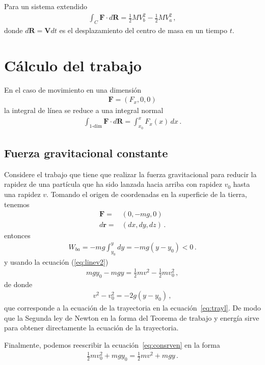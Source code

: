 Para un sistema extendido
\begin{align}
  \int_C \mathbf{F}\cdot d\mathbf{R}=\tfrac{1}{2}M V_b^2-\tfrac{1}{2}M V_a^2\,,
\end{align}
donde $d\mathbf{R}=\mathbf{V}dt$ es el desplazamiento del centro de masa en un tiempo $t$.


\section{Cálculo del trabajo}
En el caso de movimiento en una dimensión
\begin{align*}
  \mathbf{F}=(F_x,0,0)
\end{align*}
la integral de línea se reduce a una integral normal
\begin{align*}
  \int_{\text{1-dim}}\mathbf{F}\cdot d\mathbf{R}=\int_{x_0}^{x}F_x(x)\,dx\,.
\end{align*}


\subsection{Fuerza gravitacional constante}
Considere el trabajo que tiene que realizar la fuerza gravitacional
para reducir la rapidez de una partícula que ha sido lanzada hacia
arriba con rapidez $v_0$ hasta una rapidez $v$. Tomando el origen de coordenadas en la superficie de la tierra, tenemos
\begin{align*}
  \mathbf{F}=&(0,-mg,0)\nonumber\\
  d\mathbf{r}=&(dx,dy,dz)\,.
\end{align*}
entonces
\begin{align*}
  W_{ba}=-mg\int_{y_0}^ydy=-mg(y-y_0)<0\,.
\end{align*}
y usando la ecuación (\ref{eq:linev2})
\begin{align}
  \label{eq:consrven}
  mgy_0-mgy=\tfrac{1}{2}m v^2-\tfrac{1}{2}m v_0^2\,,
\end{align}
de donde
\begin{align*}
  v^2-v_0^2=-2g(y-y_0)\,,
\end{align*}
que corresponde a la ecuación de la trayectoria en la
ecuación~\eqref{eq:trayl}. De modo que la Segunda ley de Newton en la
forma del Teorema de trabajo y energía sirve para obtener directamente
la ecuación de la trayectoria.

Finalmente, podemos reescribir la ecuación~\eqref{eq:consrven} en la
forma
\begin{align}
  \tfrac{1}{2}m v_0^2+mgy_0=\tfrac{1}{2}m v^2+mgy\,.
\end{align}

